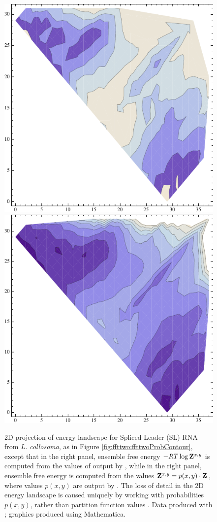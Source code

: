 \begin{figure}[!ht]
\centering
\includegraphics[width=.45\textwidth]{Figures/FFTbor2D/rtwofoldProbContour.pdf}
\quad
\includegraphics[width=.45\textwidth]{Figures/FFTbor2D/rtwofoldEnsFreeEnergyContour.pdf}
\caption{
2D projection of energy landscape for Spliced Leader (SL) RNA
from {\em L. collosoma}, as in
Figure \ref{fig:ffttwo:ffttwoProbContour},
except that in the right panel, ensemble free energy $-RT \log {\bf Z}^{x,y}_{}$
is computed from the values of  output by \rnatwofold,
while in the right panel, ensemble free energy is computed from
the values ${\bf Z}^{x,y}_{}=p(x,y) \cdot {\bf Z}^{}_{}$, where values $p(x,y)$ are output
by \rnatwofold.
The loss of detail in the 2D energy landscape is caused uniquely by
working with probabilities $p(x,y)$, rather than partition function
values .
Data produced with \rnatwofold; graphics produced using Mathematica.
}
\label{fig:ffttwo:rtwofoldProbContour}
\end{figure}
